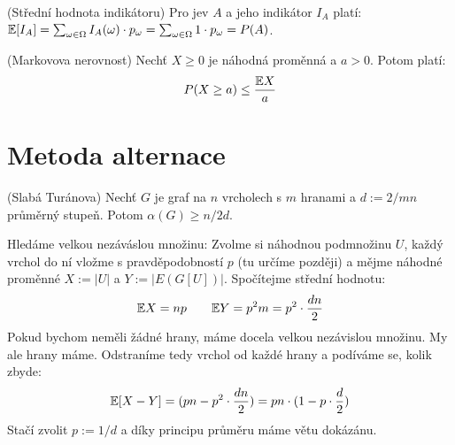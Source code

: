 \poz (Střední hodnota indikátoru) Pro jev $A$ a jeho indikátor $I_A$ platí: 
$\mathbb{E}[I_A] = \sum_{\omega \in \Omega} I_A(\omega) \cdot p_\omega = \sum_{\omega 
\in \Omega} 1 \cdot p_\omega = P(A)$.

\vt (Markovova nerovnost) Nechť $X \geq 0$ je náhodná proměnná a $a > 0$. Potom 
platí:
\begin{align}
	P(X \geq a) \leq {\mathbb{E}X \over a}
\end{align}


\section{Metoda alternace}

\vt (Slabá Turánova) Nechť $G$ je graf na $n$ vrcholech s $m$ hranami a $d := 
2/mn$ průměrný stupeň. Potom $\alpha(G) \geq n/2d$.

\dk Hledáme velkou nezáváslou množinu: Zvolme si náhodnou podmnožinu $U$, každý 
vrchol do ní vložme s pravděpodobností $p$ (tu určíme později) a mějme náhodné 
proměnné $X := |U|$ a $Y := |E(G[U])|$. Spočítejme střední hodnotu:
\begin{align}
	\mathbb{E} X = np \qquad \mathbb{E} Y = p^2 m = p^2 \cdot {dn \over 2 }
\end{align}
Pokud bychom neměli žádné hrany, máme docela velkou nezávislou množinu. My ale 
hrany máme. Odstraníme tedy vrchol od každé hrany a podíváme se, kolik zbyde:
\begin{align}
	\mathbb{E}[X - Y] = (pn - p^2 \cdot {dn \over 2}) = pn \cdot (1-p \cdot {d \over 2})
\end{align}
Stačí zvolit $ p := 1/d$ a díky principu průměru máme větu dokázánu.
